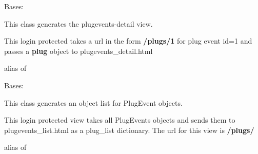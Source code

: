 \documentclass[letterpaper,10pt,english]{sphinxmanual}
\begin{document}

\begin{fulllineitems}
\label{api:mousedb.timed_mating.views.PlugEventsDetail}
Bases: {\hyperref[api:mousedb.views.ProtectedDetailView]{}}

This class generates the plugevents-detail view.

This login protected takes a url in the form \textbf{/plugs/1} for plug event id=1 and passes a \textbf{plug} object to plugevents\_detail.html


\begin{fulllineitems}
\label{api:mousedb.timed_mating.views.PlugEventsDetail.model}
alias of 

\end{fulllineitems}


\end{fulllineitems}



\begin{fulllineitems}
\label{api:mousedb.timed_mating.views.PlugEventsList}
Bases: {\hyperref[api:mousedb.views.ProtectedListView]{}}

This class generates an object list for PlugEvent objects.

This login protected view takes all PlugEvents objects and sends them to plugevents\_list.html as a plug\_list dictionary.
The url for this view is \textbf{/plugs/}


\begin{fulllineitems}
\label{api:mousedb.timed_mating.views.PlugEventsList.model}
alias of 

\end{fulllineitems}


\end{fulllineitems}
\end{document}
